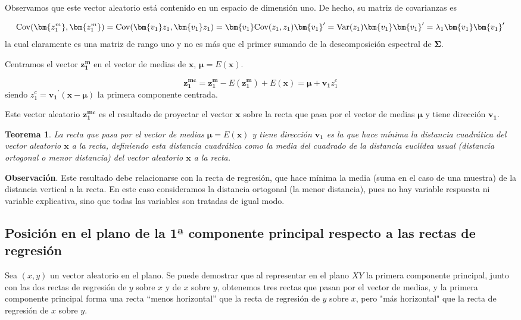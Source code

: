 \documentclass[
  a4paper,
  oneside]{scrbook}
\newtheorem{theorem}{Teorema}[chapter]
\theoremstyle{definition}
\theoremstyle{definition}
\theoremstyle{definition}
\theoremstyle{definition}
\theoremstyle{remark}
\begin{document}
Observamos que este vector aleatorio está contenido en un espacio de
dimensión uno. De hecho, su matriz de covarianzas es

\[\textnormal{Cov}(\bm{z_1^m},\bm{z_1^m})=\textnormal{Cov}(\bm{v_1} z_1, \bm{v_1} z_1)=\bm{v_1} \textnormal{Cov}(z_1,z_1) \bm{v_1}^{\prime}= \textnormal{Var}(z_1) \bm{v_1} \bm{v_1}^{\prime}
=\lambda_1 \bm{v_1} \bm{v_1}^{\prime}\] la cual claramente es una matriz
de rango uno y no es más que el primer sumando de la descomposición
espectral de \(\bm\Sigma\).

Centramos el vector \(\bm{z_1^m}\) en el vector de medias de \(\bm{x}\),
\(\bm\mu=E(\bm{x})\).

\[\bm{z_1^{mc}}=\bm{z_1^m}-E(\bm{z_1^m})+E(\bm{x})=\bm\mu + \bm{v_1} z_1^c\]
siendo \(z_1^c=\bm{v_1}^{\prime} (\bm{x}-\bm\mu)\) la primera componente
centrada.

Este vector aleatorio \(\bm{z_1^{mc}}\) es el resultado de proyectar el
vector \(\bm{x}\) sobre la recta que pasa por el vector de medias \(\bm\mu\)
y tiene dirección \(\bm{v_1}\).

\begin{theorem}
\protect\hypertarget{thm:unnamed-chunk-84}{}\label{thm:unnamed-chunk-84}La recta que pasa por el vector de medias \(\bm\mu=E(\bm{x})\) y tiene
dirección \(\bm{v_1}\) es la que hace mínima la distancia cuadrática del
vector aleatorio \(\bm{x}\) a la recta, definiendo esta distancia
cuadrática como la media del cuadrado de la distancia euclídea usual
(distancia ortogonal o menor distancia) del vector aleatorio \(\bm{x}\) a
la recta.
\end{theorem}

\textbf{Observación}. Este resultado debe relacionarse con la recta de
regresión, que hace mínima la media (suma en el caso de una muestra) de
la distancia vertical a la recta. En este caso consideramos la distancia
ortogonal (la menor distancia), pues no hay variable respuesta ni
variable explicativa, sino que todas las variables son tratadas de igual
modo.

\subsection{Posición en el plano de la 1ª componente principal respecto a las rectas de regresión}\label{posicion-en-el-plano-de-la-1a-componente-principal-respecto-a-las-rectas-de-regresion}

Sea \((x,y)\) un vector aleatorio en el plano. Se puede demostrar que al
representar en el plano \(XY\) la primera componente principal, junto con
las dos rectas de regresión de \(y\) sobre \(x\) y de \(x\) sobre \(y\),
obtenemos tres rectas que pasan por el vector de medias, y la primera
componente principal forma una recta ``menos horizontal'' que la recta de
regresión de \(y\) sobre \(x\), pero "más horizontal" que la recta de
regresión de \(x\) sobre \(y\).
\end{document}
